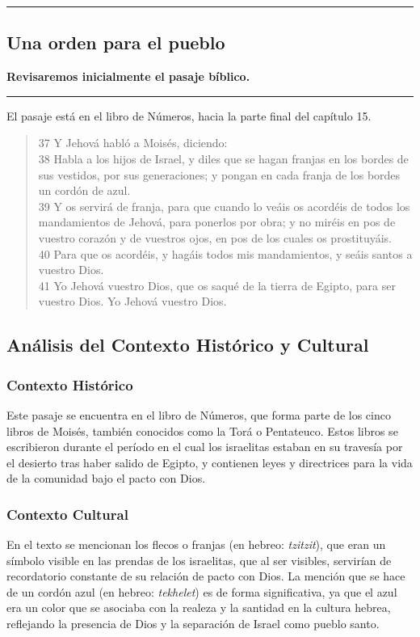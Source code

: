 {\color{gray}\hrule}
\begin{center}
\section{Una orden para el pueblo}
\textbf{Revisaremos inicialmente el pasaje bíblico.}
\end{center}
{\color{gray}\hrule}

\begin{multicols}{2}

El pasaje \cite{mainPasaje} está en el libro de Números, hacia la parte final del capítulo 15.

\begin{quote}
  37 Y Jehová habló a Moisés, diciendo:\\
  38 Habla a los hijos de Israel, y diles que se hagan franjas en los bordes de sus vestidos, por sus generaciones; y pongan en cada franja de los bordes un cordón de azul.\\
  39 Y os servirá de franja, para que cuando lo veáis os acordéis de todos los mandamientos de Jehová, para ponerlos por obra; y no miréis en pos de vuestro corazón y de vuestros ojos, en pos de los cuales os prostituyáis.\\
  40 Para que os acordéis, y hagáis todos mis mandamientos, y seáis santos a vuestro Dios.\\
  41 Yo Jehová vuestro Dios, que os saqué de la tierra de Egipto, para ser vuestro Dios. Yo Jehová vuestro Dios.
\end{quote}

\subsection{Análisis del Contexto Histórico y Cultural}

\subsubsection{Contexto Histórico}
Este pasaje se encuentra en el libro de Números, que forma parte de los cinco libros de Moisés, también conocidos como la Torá o Pentateuco. Estos libros se escribieron durante el período en el cual los israelitas estaban en su travesía por el desierto tras haber salido de Egipto, y contienen leyes y directrices para la vida de la comunidad bajo el pacto con Dios.

\subsubsection{Contexto Cultural}
En el texto se mencionan los flecos o franjas (en hebreo: \textit{tzitzit}), que eran un símbolo visible en las prendas de los israelitas, que al ser visibles, servirían de recordatorio constante de su relación de pacto con Dios.
La mención que se hace de un cordón azul (en hebreo: \textit{tekhelet}) es de forma significativa, ya que el azul era un color que se asociaba con la realeza y la santidad en la cultura hebrea, reflejando la presencia de Dios y la separación de Israel como pueblo santo.


\end{multicols}
